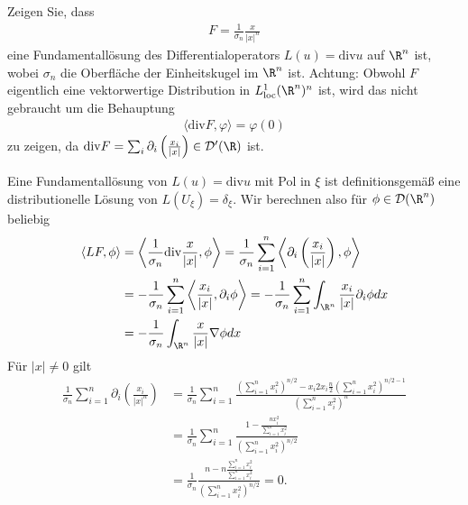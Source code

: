 
\begin{exercise}

Zeigen Sie, dass
\begin{align*}
  F = \frac{1}{\sigma_n}\frac{x}{|x|^n}
\end{align*}
eine Fundamentallösung des Differentialoperators $L(u) = \mathrm{div} u$ auf $\R^n$ ist,
wobei $\sigma_n$ die Oberfläche der Einheitskugel im $\R^n$ ist. Achtung:
Obwohl $F$ eigentlich eine vektorwertige Distribution in $L_{\mathrm{loc}}^1(\R^n)^n$ ist,
wird das nicht gebraucht um die Behauptung
\begin{align*}
  \langle \mathrm{div} F, \varphi \rangle = \varphi(0)
\end{align*}
zu zeigen, da
$\mathrm{div} F = \sum_{i}\partial_i\left(\frac{x_i}{|x|}\right) \in \mathcal{D}^{\prime}(\R)$
ist.
\end{exercise}


\begin{solution}
Eine Fundamentallösung von $L(u) = \mathrm{div} u$ mit Pol in $\xi$ ist definitionsgemäß
eine distributionelle Lösung von $L(U_{\xi}) = \delta_{\xi}$. Wir berechnen also
für $\phi \in \mathcal{D}(\R^n)$ beliebig
\begin{align*}
  \langle L F, \phi \rangle
  &= \left\langle \frac{1}{\sigma_n}\mathrm{div}\frac{x}{|x|}, \phi \right\rangle
  = \frac{1}{\sigma_n}\sum_{i=1}^n\left\langle \partial_i\left(\frac{x_i}{|x|}\right), \phi \right\rangle \\
  &= -\frac{1}{\sigma_n}\sum_{i=1}^n\left\langle \frac{x_i}{|x|}, \partial_i\phi \right\rangle
  = -\frac{1}{\sigma_n}\sum_{i=1}^n\int_{\R^n}\frac{x_i}{|x|}\partial_i\phi dx  \\
  &= -\frac{1}{\sigma_n}\int_{\R^n}\frac{x}{|x|}\nabla \phi dx  \\
\end{align*}
Für $|x| \neq 0$ gilt
\begin{align*}
  \frac{1}{\sigma_n}\sum_{i=1}^n\partial_i\left(\frac{x_i}{|x|^n}\right)
  &= \frac{1}{\sigma_n}\sum_{i=1}^n\frac{\left(\sum_{i=1}^nx_i^2\right)^{n/2} - x_i2x_i\frac{n}{2}\left(\sum_{i=1}^nx_i^2\right)^{n/2 - 1}}{\left(\sum_{i=1}^nx_i^2\right)^n} \\
  &= \frac{1}{\sigma_n}\sum_{i=1}^n\frac{1 - \frac{nx_i^2}{\sum_{i=1}^nx_i^2}}{\left(\sum_{i=1}^nx_i^2\right)^{n/2}} \\
  &= \frac{1}{\sigma_n}\frac{n - n\frac{\sum_{i=1}^nx_i^2}{\sum_{i=1}^nx_i^2}}{\left(\sum_{i=1}^nx_i^2\right)^{n/2}} = 0.
\end{align*}

\end{solution}

